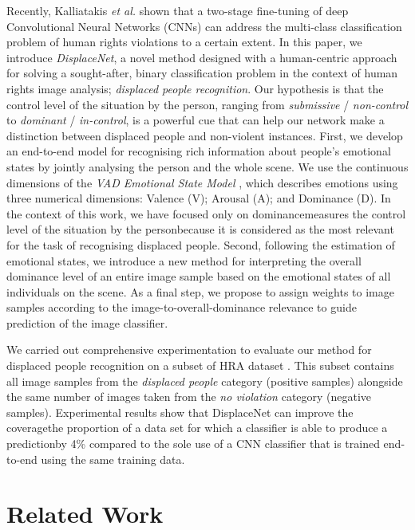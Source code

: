 \documentclass[10pt,twocolumn,letterpaper]{article}
\begin{document}
Recently, Kalliatakis \textit{et al.} \cite{kalliatakis2019exploring} shown that a two-stage fine-tuning of deep Convolutional Neural Networks (CNNs) can address the multi-class classification problem of human rights violations to a certain extent. In this paper, we introduce \textit{DisplaceNet}, a novel method designed with a human-centric approach for solving a sought-after, binary classification problem in the context of human rights image analysis; \textit{displaced people recognition}. Our hypothesis is that the control level of the situation by the person, ranging from \textit{submissive} / \textit{non-control} to \textit{dominant} / \textit{in-control}, is a powerful cue that can help our network make a distinction between displaced people and non-violent instances. First, we develop an end-to-end model for recognising rich information about people's emotional states by jointly analysing the person and the whole scene. We use the continuous dimensions of the \textit{VAD Emotional State Model} \cite{mehrabian1995framework}, which describes emotions using three numerical dimensions: Valence (V); Arousal (A); and Dominance (D). In the context of this work, we have focused only on dominance\textendash measures the control level of the situation by the person\textendash because it is considered as the most relevant for the task of recognising displaced people. Second, following the estimation of emotional states, we introduce a new method for interpreting the overall dominance level of an entire image sample based on the emotional states of all individuals on the scene. As a final step, we propose to assign weights to image samples according to the image-to-overall-dominance relevance to guide prediction of the image classifier. 

We carried out comprehensive experimentation to evaluate our method for displaced people recognition on a subset of HRA dataset \cite{kalliatakis2019exploring}. This subset contains all image samples from the \textit{displaced people} category (positive samples) alongside the same number of images taken from the \textit{no violation} category (negative samples). Experimental results
show that DisplaceNet can improve the coverage\textendash the proportion of a data set for which a classifier is able to produce a prediction\textendash by 4\% compared to the sole use of a CNN classifier that is trained end-to-end using the same training data.



\section{Related Work}
\end{document}
